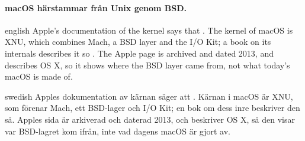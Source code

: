 \paragraph{%
  {macOS härstammar från Unix genom BSD.}} %
\begin{onlyin}{english} %
Apple's documentation of the kernel says that
.
The kernel of macOS is XNU, which combines Mach, a BSD layer and the
I/O Kit; a book on its internals describes it so%
\autocite{Levin2012Internals}.
The Apple page is archived and dated 2013, and describes OS X, so it
shows where the BSD layer came from, not what today's macOS is made of.
\end{onlyin}
\begin{onlyin}{swedish}
Apples dokumentation av kärnan säger att
.
Kärnan i macOS är XNU, som förenar Mach, ett BSD-lager och I/O Kit; en
bok om dess inre beskriver den så\autocite{Levin2012Internals}.
Apples sida är arkiverad och daterad 2013, och beskriver OS X, så den
visar var BSD-lagret kom ifrån, inte vad dagens macOS är gjort av.
\end{onlyin}

